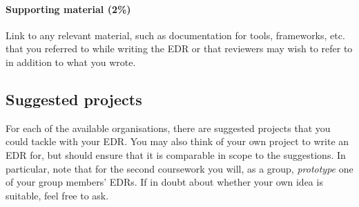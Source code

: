 \paragraph{Supporting material (2\%)} Link to any relevant material, such as documentation for tools, frameworks, etc. that you referred to while writing the EDR or that reviewers may wish to refer to in addition to what you wrote.

\subsection{Suggested projects}
\label{sec:edr-suggestions}

For each of the available organisations, there are suggested projects that you could tackle with your EDR. You may also think of your own project to write an EDR for, but should ensure that it is comparable in scope to the suggestions. In particular, note that for the second coursework you will, as a group, \emph{prototype} one of your group members' EDRs. If in doubt about whether your own idea is suitable, feel free to ask.

\subsubsection{\sshFullName}

